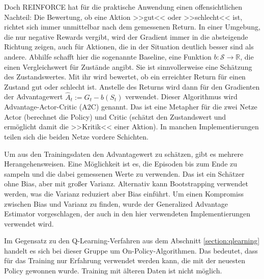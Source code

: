 Doch REINFORCE hat für die praktische Anwendung einen offensichtlichen Nachteil: Die Bewertung, ob eine Aktion >>gut<< oder >>schlecht<< ist, richtet sich immer unmittelbar nach dem gemessenen Return.
In einer Umgebung, die nur negative Rewards vergibt, wird der Gradient immer in die absteigende Richtung zeigen, auch für Aktionen, die in der Situation deutlich besser sind als andere.
Abhilfe schafft hier die sogenannte Baseline, eine Funktion $b: \mathcal{S} \rightarrow \mathbb{R}$, die einen Vergleichswert für Zustände angibt.
Sie ist sinnvollerweise eine Schätzung des Zustandswertes.
Mit ihr wird bewertet, ob ein erreichter Return für einen Zustand gut oder schlecht ist.
Anstelle des Returns wird dann für den Gradienten der Advantagewert $\hat{A}_t := G_t - b(S_t)$ verwendet.
Dieser Algorithmus wird Advantage-Actor-Critic (A2C) genannt.
Das ist eine Metapher für die zwei Netze Actor (berechnet die Policy) und Critic (schätzt den Zustandswert und ermöglicht damit die >>Kritik<< einer Aktion).
In manchen Implementierungen teilen sich die beiden Netze vordere Schichten.

Um aus den Trainingsdaten den Advantagewert zu schätzen, gibt es mehrere Herangehensweisen.
Eine Möglichkeit ist es, die Episoden bis zum Ende zu sampeln und die dabei gemessenen Werte zu verwenden.
Das ist ein Schätzer ohne Bias, aber mit großer Varianz.
Alternativ kann Bootstrapping verwendet werden, was die Varianz reduziert aber Bias einführt.
Um einen Kompromiss zwischen Bias und Varianz zu finden, wurde der Generalized Advantage Estimator \cite{https://doi.org/10.48550/arxiv.1506.02438} vorgeschlagen, der auch in den hier verwendeten Implementierungen verwendet wird.

Im Gegensatz zu den Q-Learning-Verfahren aus dem Abschnitt \ref{section:qlearning} handelt es sich bei dieser Gruppe um On-Policy-Algorithmen.
Das bedeutet, dass für das Training nur Erfahrung verwendet werden kann, die mit der neuesten Policy gewonnen wurde.
Training mit älteren Daten ist nicht möglich.

